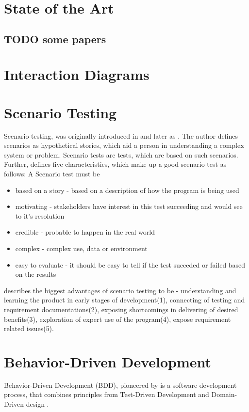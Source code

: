 
\section{State of the Art}
\subsection{TODO some papers}
\section{Interaction Diagrams}
\section{Scenario Testing}
Scenario testing, was originally introduced in \textcite{kaner2003power} and later as \textcite{kaner2013introduction}. The author defines scenarios as hypothetical stories, which aid a person in understanding a complex system or problem. Scenario tests are tests, which are based on such scenarios.  \parencite[1]{kaner2013introduction}
Further, \parencite[2-5]{kaner2003power} defines five characteristics, which make up a good scenario test as follows:
A Scenario test must be
\begin{itemize}
    \item based on a story - based on a description of how the program is being used
    \item motivating - stakeholders have interest in this test succeeding and would see to it's resolution
    \item credible - probable to happen in the real world
    \item complex - complex use, data or environment
    \item easy to evaluate - it should be easy to tell if the test succeded or failed based on the results 
\end{itemize}
\textcite{kaner2013introduction} describes the biggest advantages of scenario testing to be  - understanding and learning the product in early stages of development(1), connecting of testing and requirement documentations(2), exposing shortcomings in delivering of desired benefits(3), exploration of expert use of the program(4), expose requirement related issues(5).

\section{Behavior-Driven Development}
Behavior-Driven Development (BDD), pioneered by  \textcite{north2006behavior} is a software development process, that combines principles from Test-Driven Development and Domain-Driven design \parencite{evans2004domain}. 

